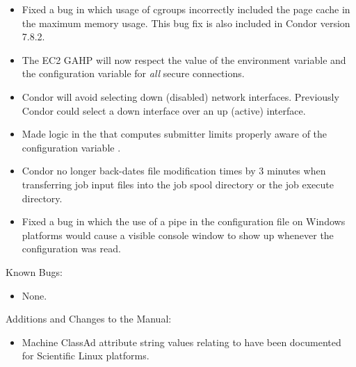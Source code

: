 \begin{itemize}

\item Fixed a bug in which usage of cgroups incorrectly included the page cache 
in the maximum memory usage.
This bug fix is also included in Condor version 7.8.2.

\item The EC2 GAHP will now respect the value of the environment variable
 and the configuration variable
 for \emph{all} secure connections.

\item Condor will avoid selecting down (disabled) network interfaces.  Previously Condor could select a down interface over an up (active) interface.

\item Made logic in the  that computes submitter limits 
properly aware of the configuration variable
.


\item Condor no longer back-dates file modification times by 3 minutes
when transferring job input files into the job spool directory or the job
execute directory.

\item Fixed a bug in which the use of a pipe in the configuration file 
on Windows platforms would cause a visible console window 
to show up whenever the configuration was read.

\end{itemize}

\noindent Known Bugs:

\begin{itemize}

\item None.

\end{itemize}

\noindent Additions and Changes to the Manual:

\begin{itemize}

\item Machine ClassAd attribute string values relating to  have
been documented for Scientific Linux platforms.

\end{itemize}


